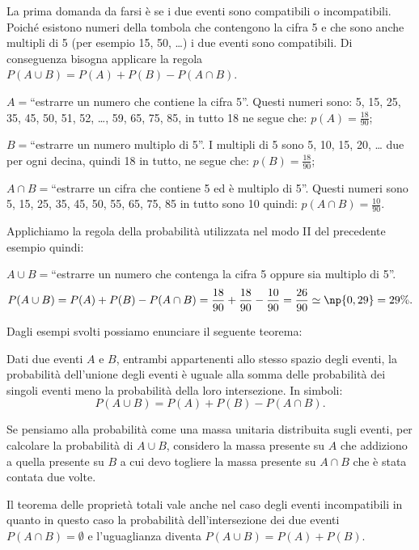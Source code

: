 \begin{exrig}
\begin{esempio}
La prima domanda da farsi è se i due eventi sono compatibili o incompatibili. Poiché esistono numeri della tombola che contengono la cifra 5 e che sono anche multipli di 5 (per esempio 15, 50, \ldots) i due eventi sono compatibili. Di conseguenza bisogna applicare la regola $P(A\cup B)=P(A)+P(B)-P(A\cap B)$.
\begin{description*}
\item $A=$``estrarre un numero che contiene la cifra 5''. Questi numeri sono: 5, 15, 25, 35, 45, 50, 51, 52, \ldots, 59, 65, 75, 85, in tutto 18 ne segue che: $p(A)=\frac{18}{90}$;
\item $B=$``estrarre un numero multiplo di 5''. I multipli di 5 sono 5, 10, 15, 20, \ldots{} due per ogni decina, quindi 18 in tutto, ne segue che: $p(B)=\frac{18}{90}$;
\item $A\cap B=$``estrarre un cifra che contiene 5 ed è multiplo di 5''. Questi numeri sono 5, 15, 25, 35, 45, 50, 55, 65, 75, 85 in tutto sono 10 quindi: $p(A\cap B)=\frac{10}{90}$.
\end{description*}
Applichiamo la regola della probabilità utilizzata nel modo II del precedente esempio quindi:

$A\cup B=$``estrarre un numero che contenga la cifra 5 oppure sia multiplo di 5''. \[P(A\cup B)=P(A)+P(B)-P(A\cap B)=\frac{18}{90}+\frac{18}{90}-\frac{10}{90}=\frac{26}{90}\simeq \np{0,29}= 29\%. \]
\end{esempio}
\end{exrig}

Dagli esempi svolti possiamo enunciare il seguente teorema:

\begin{teorema}
Dati due eventi $A$ e $B$, entrambi appartenenti allo stesso spazio degli eventi, la probabilità dell'unione degli eventi è uguale alla somma delle probabilità dei singoli eventi meno la probabilità della loro intersezione.
In simboli: \[P(A\cup B)=P(A)+P(B)-P(A\cap B).\]
\end{teorema}

Se pensiamo alla probabilità come una massa unitaria distribuita sugli eventi, per calcolare la probabilità di $A\cup B$, considero la massa presente su $A$ che addiziono a quella presente su $B$ a cui devo togliere la massa presente su $A\cap B$ che è stata contata due volte.

\osservazione Il teorema delle proprietà totali vale anche nel caso degli eventi incompatibili in quanto in questo caso la probabilità dell'intersezione dei due eventi $P(A\cap B)=\emptyset$ e l'uguaglianza diventa $P(A\cup B)=P(A)+P(B)$.

